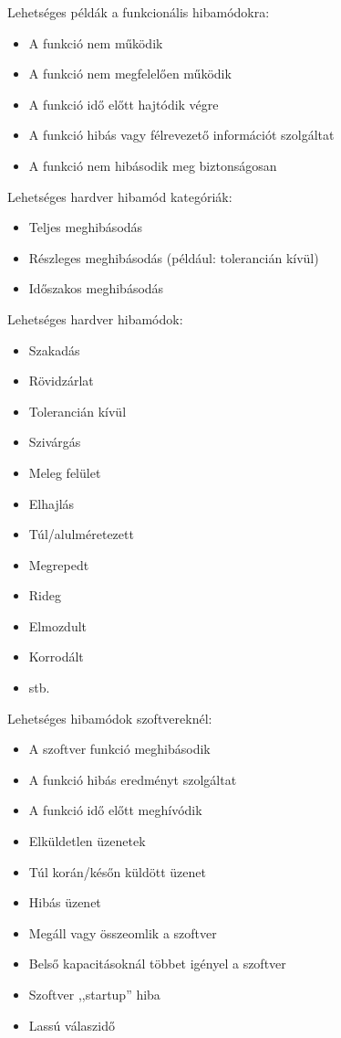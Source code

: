 Lehetséges példák a funkcionális hibamódokra:
\begin{itemize}
    \item A funkció nem működik
    \item A funkció nem megfelelően működik
    \item A funkció idő előtt hajtódik végre
    \item A funkció hibás vagy félrevezető információt szolgáltat
    \item A funkció nem hibásodik meg biztonságosan
\end{itemize}
Lehetséges hardver hibamód kategóriák:
\begin{itemize}
    \item Teljes meghibásodás
    \item Részleges meghibásodás (például: tolerancián kívül)
    \item Időszakos meghibásodás
\end{itemize}
Lehetséges hardver hibamódok:
\begin{itemize}
    \item Szakadás
    \item Rövidzárlat
    \item Tolerancián kívül
    \item Szivárgás
    \item Meleg felület
    \item Elhajlás
    \item Túl/alulméretezett
    \item Megrepedt
    \item Rideg
    \item Elmozdult
    \item Korrodált
    \item stb.
\end{itemize}
Lehetséges hibamódok szoftvereknél:
\begin{itemize}
    \item A szoftver funkció meghibásodik
    \item A funkció hibás eredményt szolgáltat
    \item A funkció idő előtt meghívódik
    \item Elküldetlen üzenetek
    \item Túl korán/későn küldött üzenet
    \item Hibás üzenet
    \item Megáll vagy összeomlik a szoftver
    \item Belső kapacitásoknál többet igényel a szoftver
    \item Szoftver ,,startup'' hiba
    \item Lassú válaszidő
\end{itemize}

